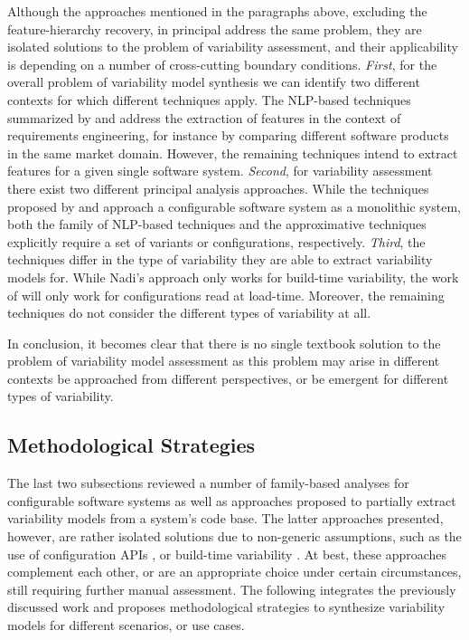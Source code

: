 Although the approaches mentioned in the paragraphs above, excluding the
feature-hierarchy recovery, in principal address the same problem, they are
isolated solutions to the problem of variability assessment, and their
applicability is depending on a number of cross-cutting boundary conditions.
\emph{First}, for the overall problem of variability model synthesis we can
identify two different contexts for which different techniques apply. The NLP-based
techniques summarized by \cite{alves_exploratory_2008} and \cite{bakar_feature_2015} address
the extraction of features in the context of requirements engineering, for instance by comparing different
software products in the same market domain. However, the remaining techniques
intend to extract features for a given single software system.
\emph{Second}, for variability assessment there exist two different principal
analysis approaches. While the techniques proposed by \cite{nadi_mining_2014,nadi_where_2015}
and \cite{rabkin_static_2011} approach a configurable software system as a monolithic system,
both the family of NLP-based techniques and the approximative techniques
\cite{lopez-herrejon_reverse_2012,lopez-herrejon_assessment_2015,linsbauer_feature_2014}
explicitly require a set of variants or configurations, respectively.
\emph{Third}, the techniques differ in the type of variability they are able to
extract variability models for. While Nadi’s approach only works for build-time
variability, the work of \cite{rabkin_static_2011} will only work for configurations read at
load-time. Moreover, the remaining techniques do not consider the different types of
variability at all.

In conclusion, it becomes clear that there is no single textbook solution to
the problem of variability model assessment as this problem may arise in
different contexts be approached from different perspectives, or be emergent
for different types of variability.

\subsection{Methodological Strategies}
The last two subsections reviewed a number of family-based analyses for
configurable software systems as well as approaches proposed to partially
extract variability models from a system’s code base. The latter approaches
presented, however, are rather isolated solutions due to non-generic
assumptions, such as the use of configuration APIs \citep{rabkin_static_2011},
or build-time variability \citep{nadi_where_2015}. At best, these approaches
complement each other, or are an appropriate choice under certain
circumstances, still requiring further manual assessment. The following
integrates the previously discussed work and proposes methodological strategies
to synthesize variability models for different scenarios, or use cases.

